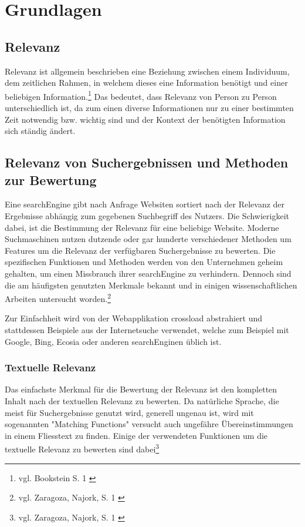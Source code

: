 \chapter{Grundlagen}
\label{ch:grundlagen}

\section{Relevanz}

Relevanz ist allgemein beschrieben eine Beziehung zwischen einem Individuum, dem zeitlichen Rahmen, in welchem dieses eine Information benötigt und einer beliebigen Information.\footnote{vgl. Bookstein S. 1 \cite{bookstein2007}}
Das bedeutet, dass Relevanz von Person zu Person unterschiedlich ist, da zum einen diverse Informationen nur zu einer bestimmten Zeit notwendig bzw. wichtig sind und der Kontext der benötigten Information sich ständig ändert.


\section{Relevanz von Suchergebnissen und Methoden zur Bewertung}

Eine \gls{searchEngine} gibt nach Anfrage Websiten sortiert nach der Relevanz der Ergebnisse abhängig zum gegebenen Suchbegriff des Nutzers.
Die Schwierigkeit dabei, ist die Bestimmung der Relevanz für eine beliebige Website.
Moderne Suchmaschinen nutzen dutzende oder gar hunderte verschiedener Methoden um Features um die Relevanz der verfügbaren Suchergebnisse zu bewerten.
Die spezifischen Funktionen und Methoden werden von den Unternehmen geheim gehalten, um einen Missbrauch ihrer \gls{searchEngine} zu verhindern.
Dennoch sind die am häufigsten genutzten Merkmale bekannt und in einigen wissenschaftlichen Arbeiten untersucht worden.\footnote{vgl. Zaragoza, Najork, S. 1 \cite{zaragoza2018}}

Zur Einfachheit wird von der Webapplikation \gls{crossload} abstrahiert und stattdessen Beispiele aus der Internetsuche verwendet, welche zum Beispiel mit Google, Bing, Ecosia oder anderen \gls{searchEngine}n üblich ist.

\subsection{Textuelle Relevanz}
Das einfachste Merkmal für die Bewertung der Relevanz ist den kompletten Inhalt nach der textuellen Relevanz zu bewerten.
Da natürliche Sprache, die meist für Suchergebnisse genutzt wird, generell ungenau ist, wird mit sogenannten "Matching Functions" versucht auch ungefähre Übereinstimmungen in einem Fliesstext zu finden.
Einige der verwendeten Funktionen um die textuelle Relevanz zu bewerten sind dabei\footnote{vgl. Zaragoza, Najork, S. 1 \cite{zaragoza2018}}

